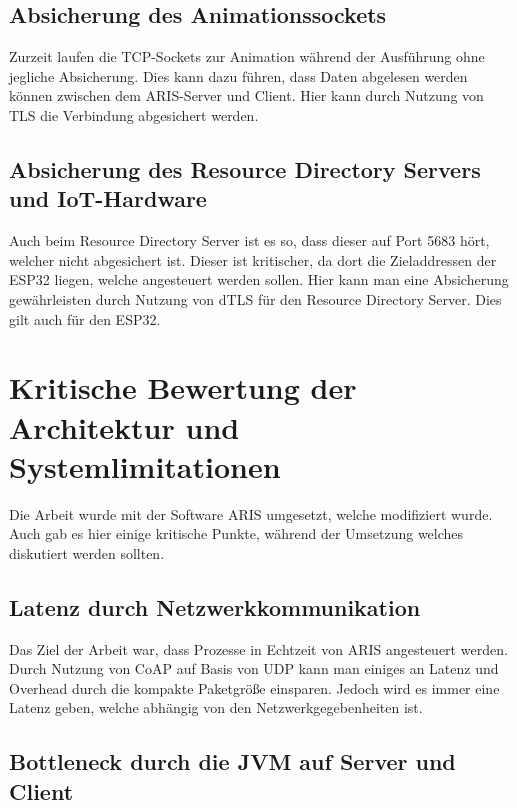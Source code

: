 \subsection{Absicherung des Animationssockets}

Zurzeit laufen die TCP-Sockets zur Animation während der Ausführung ohne jegliche Absicherung. Dies kann dazu 
führen, dass Daten abgelesen werden können zwischen dem ARIS-Server und Client. Hier kann durch Nutzung von TLS
die Verbindung abgesichert werden. \cite{wendzel_it-sicherheit_2018}

\subsection{Absicherung des Resource Directory Servers und IoT-Hardware}

Auch beim Resource Directory Server ist es so, dass dieser auf Port 5683 hört, welcher nicht abgesichert ist. Dieser 
ist kritischer, da dort die Zieladdressen der ESP32 liegen, welche angesteuert werden sollen. Hier kann man eine Absicherung 
gewährleisten durch Nutzung von dTLS \cite{wendzel_it-sicherheit_2018} für den Resource Directory Server. Dies gilt auch für den ESP32.

\section{Kritische Bewertung der Architektur und Systemlimitationen}

Die Arbeit wurde mit der Software ARIS umgesetzt, welche modifiziert wurde. Auch gab es hier einige kritische Punkte, während 
der Umsetzung welches diskutiert werden sollten.

\subsection{Latenz durch Netzwerkkommunikation}

Das Ziel der Arbeit war, dass Prozesse in Echtzeit von ARIS angesteuert werden. Durch Nutzung von CoAP auf Basis von UDP kann man 
einiges an Latenz und Overhead durch die kompakte Paketgröße einsparen. Jedoch wird es immer eine Latenz geben, welche abhängig von 
den Netzwerkgegebenheiten ist.

\subsection{Bottleneck durch die JVM auf Server und Client}

